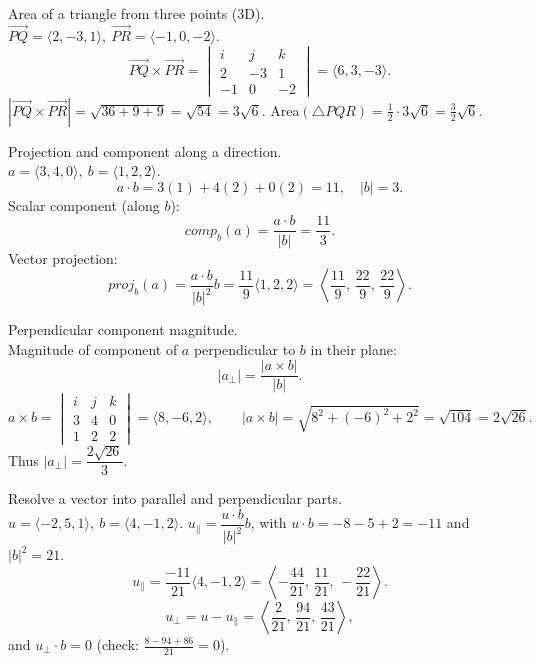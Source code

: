 \documentclass[11pt]{article}
\def\textbf#1{#1}%
\def\mathbf#1{#1}%
\def\mathrm#1{#1}%
\begin{document}
\begin{solution}
\textbf{Area of a triangle from three points (3D).}\\
\(\overrightarrow{PQ}=\langle2,-3,1\rangle,\ \overrightarrow{PR}=\langle-1,0,-2\rangle\).
\[
\overrightarrow{PQ}\times\overrightarrow{PR}=
\begin{vmatrix}
\mathbf{i}&\mathbf{j}&\mathbf{k}\\[2pt]
2&-3&1\\
-1&0&-2
\end{vmatrix}
=\langle6,3,-3\rangle.
\]
\(|\overrightarrow{PQ}\times\overrightarrow{PR}|=\sqrt{36+9+9}=\sqrt{54}=3\sqrt6.\)  
Area\((\triangle PQR)=\tfrac12\cdot3\sqrt6=\tfrac{3}{2}\sqrt6\).
\end{solution}

\begin{solution}
\textbf{Projection and component along a direction.}\\
\(\mathbf{a}=\langle3,4,0\rangle,\ \mathbf{b}=\langle1,2,2\rangle\).
\[
\mathbf{a}\cdot\mathbf{b}=3(1)+4(2)+0(2)=11,\quad |\mathbf{b}|=3.
\]
Scalar component (along \(\mathbf{b}\)):
\[
\mathrm{comp}_{\mathbf{b}}(\mathbf{a})=\frac{\mathbf{a}\cdot\mathbf{b}}{|\mathbf{b}|}=\frac{11}{3}.
\]
Vector projection:
\[
\mathrm{proj}_{\mathbf{b}}(\mathbf{a})=
\frac{\mathbf{a}\cdot\mathbf{b}}{|\mathbf{b}|^{2}}\mathbf{b}
=\frac{11}{9}\langle1,2,2\rangle
=\left\langle\frac{11}{9},\,\frac{22}{9},\,\frac{22}{9}\right\rangle.
\]
\end{solution}

\begin{solution}
\textbf{Perpendicular component magnitude.}\\
Magnitude of component of \(\mathbf{a}\) perpendicular to \(\mathbf{b}\) in their plane:
\[
|\mathbf{a}_{\perp}|=\frac{|\mathbf{a}\times\mathbf{b}|}{|\mathbf{b}|}.
\]
\[
\mathbf{a}\times\mathbf{b}=
\begin{vmatrix}
\mathbf{i}&\mathbf{j}&\mathbf{k}\\[2pt]
3&4&0\\
1&2&2
\end{vmatrix}
=\langle 8,-6,2\rangle,\qquad 
|\mathbf{a}\times\mathbf{b}|=\sqrt{8^{2}+(-6)^{2}+2^{2}}=\sqrt{104}=2\sqrt{26}.
\]
Thus \(|\mathbf{a}_{\perp}|=\dfrac{2\sqrt{26}}{3}.\)
\end{solution}

\begin{solution}
\textbf{Resolve a vector into parallel and perpendicular parts.}\\
\(\mathbf{u}=\langle-2,5,1\rangle,\ \mathbf{b}=\langle4,-1,2\rangle\).  
\(\mathbf{u}_\parallel=\dfrac{\mathbf{u}\cdot\mathbf{b}}{|\mathbf{b}|^2}\mathbf{b}\), with
\(\mathbf{u}\cdot\mathbf{b}=-8-5+2=-11\) and \(|\mathbf{b}|^2=21\).
\[
\mathbf{u}_\parallel=\frac{-11}{21}\langle4,-1,2\rangle
=\left\langle-\frac{44}{21},\,\frac{11}{21},\,-\frac{22}{21}\right\rangle.
\]
\[
\mathbf{u}_\perp=\mathbf{u}-\mathbf{u}_\parallel
=\left\langle\frac{2}{21},\,\frac{94}{21},\,\frac{43}{21}\right\rangle,
\]
and \( \mathbf{u}_\perp\cdot\mathbf{b}=0\) (check: \( \frac{8-94+86}{21}=0\)).
\end{solution}
\end{document}
